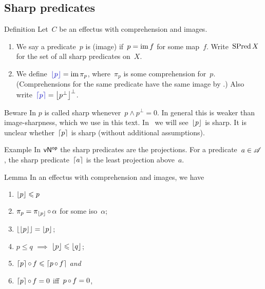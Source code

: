 \documentclass[b]{subfiles}
\begin{document}
\subsection{Sharp predicates}
\begin{parsec}%
\begin{point}{Definition}%
Let~$C$ be an effectus with comprehension and images.
\begin{enumerate}
\item
    We say a predicate~$p$ is (image) 
        if~$p = \operatorname{im} f$ for some map~$f$.
    Write~$\operatorname{SPred} X$ for the set of all sharp predicates on~$X$.
\item
We define~$\Define{\floor{p}} = \IM \pi_p$,
    where~$\pi_p$ is some comprehension for~$p$.
(Comprehensions for the same predicate have the same image
    by .)
Also write~$\Define{\ceil{p}} = \floor{p^\perp}^\perp$.
\end{enumerate}
\begin{point}{Beware}%
In \cite{effintro} $p$ is called sharp whenever~$p \wedge p^\perp=0$.
In general this is weaker than image-sharpness, which we use in this text.
In~
    we will see~$\left\lfloor p\right\rfloor$ is sharp.
It is unclear whether~$\left\lceil p\right\rceil$ is sharp (without additional
    assumptions).
\end{point}
\end{point}
\begin{point}{Example}%
In ${\mathsf{vN}}{^{\mathsf{op}}}$ the sharp predicates are the projections.
For a predicate~$a \in \mathscr{A}$,
    the sharp predicate~$\left\lceil a\right\rceil$
    is the least projection above~$a$.
\end{point}
\begin{point}{Lemma}%
In an effectus with comprehension and images, we have
\begin{multicols}{2}
\begin{enumerate}
\item
    $\left\lfloor p\right\rfloor \leqslant p$
\item
    $\pi_p = \pi_{\left\lfloor p\right\rfloor} \mathop{\circ} \alpha$
        for some iso~$\alpha$;
\item
    $\left\lfloor\left\lfloor p\right\rfloor\right\rfloor = \left\lfloor p\right\rfloor$;
\item
    $p \leq q$ $\implies$ $\left\lfloor p\right\rfloor \leqslant \left\lfloor q\right\rfloor$;
\item
    $\left\lceil p\right\rceil \mathop{\circ} f \leqslant \left\lceil p \mathop{\circ} f\right\rceil$ \emph{and}
\item
    $\left\lceil p\right\rceil \mathop{\circ} f =0$ iff~$p \mathop{\circ} f = 0$,
\end{enumerate}
\end{multicols}

\end{point}
\end{parsec}
\end{document}
